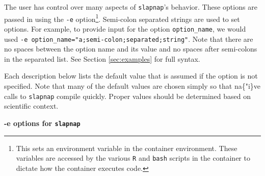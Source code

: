 \documentclass[]{article}
\let\rmarkdownfootnote\footnote%
\def\footnote{\protect\rmarkdownfootnote}
\begin{document}
The user has control over many aspects of \texttt{slapnap}'s behavior. These options are passed in using the \texttt{-e} option\footnote{This sets an environment variable in the container environment. These variables are accessed by the various \texttt{R} and \texttt{bash} scripts in the container to dictate how the container executes code.}. Semi-colon separated strings are used to set options. For example, to provide input for the option \texttt{option\_name}, we would used \texttt{-e\ option\_name="a;semi-colon;separated;string"}. Note that there are no spaces between the option name and its value and no spaces after semi-colons in the separated list. See Section \ref{sec:examples} for full syntax.

Each description below lists the default value that is assumed if the option is not specified. Note that many of the default values are chosen simply so that na\{"i\}ve calls to \texttt{slapnap} compile quickly. Proper values should be determined based on scientific context.

\textbf{-e options for \texttt{slapnap}}
\end{document}
